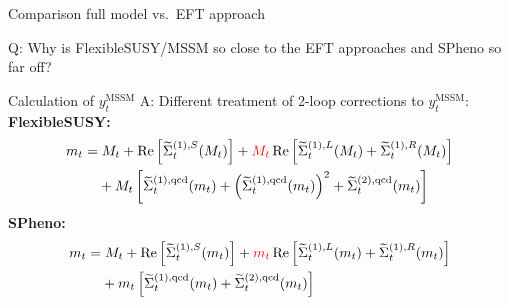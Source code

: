 \documentclass[hyperref={pdfpagelabels=false},ngerman]{beamer}
\DeclareMathOperator{\re}{Re}
\renewcommand{\emph}{\textbf}
\begin{document}
\begin{frame}{Comparison full model vs.\ EFT approach}
  \begin{center}
    Q: Why is FlexibleSUSY/MSSM so close to the EFT approaches and
    SPheno so far off?
  \end{center}
\end{frame}

\begin{frame}{Calculation of $y_t^{\text{MSSM}}$}
  A: Different treatment of 2-loop corrections to $y_t^{\text{MSSM}}$:
  \\[1em]
  \emph{FlexibleSUSY:}
  \begin{align*}
    m_t &=
    M_t+\re\left[
      \widetilde{\Sigma}_t^{(1),S}(M_t)\right] +
    \textcolor{red}{M_t} \re\left[
      \widetilde{\Sigma}_t^{(1),L}(M_t) +
      \widetilde{\Sigma}_t^{(1),R}(M_t)
    \right] \nonumber \\
    &\phantom{={}} + M_t
    \left[\widetilde{\Sigma}_t^{(1),\text{qcd}}(m_t)
      + \left(\widetilde{\Sigma}_t^{(1),\text{qcd}}(m_t)\right)^2
      + \widetilde{\Sigma}_t^{(2),\text{qcd}}(m_t)\right]
  \end{align*}
  \emph{SPheno:}
  \begin{align*}
    m_t &=
    M_t+\re\left[
      \widetilde{\Sigma}_t^{(1),S}(m_t)\right]+
    \textcolor{red}{m_t} \re\left[
      \widetilde{\Sigma}_t^{(1),L}(m_t) +
      \widetilde{\Sigma}_t^{(1),R}(m_t)
    \right] \nonumber \\
    &\phantom{={}} +
    m_t
    \left[\widetilde{\Sigma}_t^{(1),\text{qcd}}(m_t) +
      \widetilde{\Sigma}_t^{(2),\text{qcd}}(m_t)
    \right]
  \end{align*}
\end{frame}

\newcommand{\FS}{FlexibleSUSY\xspace}
\newcommand{\SARAH}{SARAH\xspace}
\newcommand{\Softsusy}{SOFTSUSY\xspace}
\newcommand{\SPheno}{SPheno\xspace}
\newcommand{\SUSYHD}{SUSYHD\xspace}

\newcommand{\bgsgs}{\beta_{\gshigh,\gshigh^2}}
\newcommand{\bytgs}{\beta_{\ythigh,\gshigh^2}}
\newcommand{\bytyt}{\beta_{\ythigh,\ythigh^2}}
\newcommand{\bvyt}{\beta_{\vhigh,\ythigh^2}}
\newcommand{\blambdaytyt}{\beta_{\lambdahigh,\ythigh^4}}
\newcommand{\blambdayt}{\beta_{\lambdahigh,\ythigh^2\lambdahigh}}
\newcommand{\blambdalambda}{\beta_{\lambdahigh,\lambdahigh^2}}
\newcommand{\btildegsgs}{\tilde\beta_{\gshigh,\gshigh^2}}
\newcommand{\btildeytgs}{\tilde\beta_{\ythigh,\gshigh^2}}
\newcommand{\btildeytyt}{\tilde\beta_{\ythigh,\ythigh^2}}
\newcommand{\btildevyt}{\tilde\beta_{\vhigh,\ythigh^2}}
\end{document}
